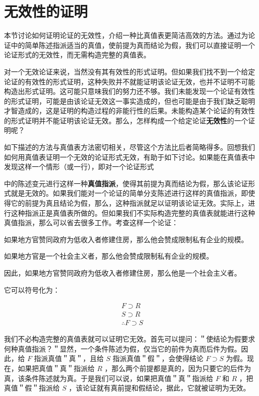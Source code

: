 \section{无效性的证明}

\begin{logicbox}[title=引言]
本节讨论如何证明论证的无效性，介绍一种比真值表更简洁高效的方法。通过为论证中的简单陈述指派适当的真值，使前提为真而结论为假，我们可以直接证明一个论证形式的无效性，而无需构造完整的真值表。
\end{logicbox}

对一个无效论证来说，当然没有其有效性的形式证明。但如果我们找不到一个给定论证的有效性的形式证明，这种失败并不就能证明该论证无效，也并不证明不可能构造出形式证明。这可能只意味我们的努力还不够。我们未能发现一个论证有效性的形式证明，可能是由该论证无效这一事实造成的，但也可能是由于我们缺乏聪明才智造成的，这是证明的构造过程的非能行性的后果。未能构造某个论证的有效性的形式证明并不能证明该论证无效。那么，怎样构成一个给定论证\textbf{无效性}的一个证明呢？

如下描述的方法与真值表方法密切相关，尽管这个方法比后者简略得多。回想我们如何用真值表证明一个无效的论证形式无效，有助于如下讨论。如果能在真值表中发现这样一个情形（或一行），即对一个论证形式

中的陈述变元进行这样一种\textbf{真值指派}，使得其前提为真而结论为假，那么该论证形式就是无效的。如果我们能对一个论证的简单分支陈述进行这样的真值指派，即使得它的前提为真且结论为假，那么，这种指派就足以证明该论证无效。实际上，进行这种指派正是真值表所做的。但如果我们不实际构造完整的真值表就能进行这种真值指派，那么可以省去很多工作。考查这样一个论证：

如果地方官赞同政府为低收入者修建住房，那么他会赞成限制私有企业的规模。

如果地方官是一个社会主义者，那么他会赞成限制私有企业的规模。

因此，如果地方官赞同政府为低收入者修建住房，那么他是一个社会主义者。

它可以符号化为：

$$
\begin{aligned}
& F \supset R \\
& S \supset R \\
& \therefore F \supset S
\end{aligned}
$$

我们不必构造完整的真值表就可以证明它无效。首先可以提问：＂使结论为假要求何种真值指派？＂显然，一个条件陈述为假，仅当它的前件为真而后件为假。因此，给 $F$ 指派真值＂真＂，且给 $S$ 指派真值＂假＂，会使得结论 $F \supset S$ 为假。现在，如果把真值＂真＂指派给 $R$ ，那么两个前提都是真的，因为只要它的后件为真，该条件陈述就为真。于是我们可以说，如果把真值＂真＂指派给 $F$ 和 $R$ ，把真值＂假＂指派给 $S$ ，该论证就有真前提和假结论，据此，它就被证明为无效。

